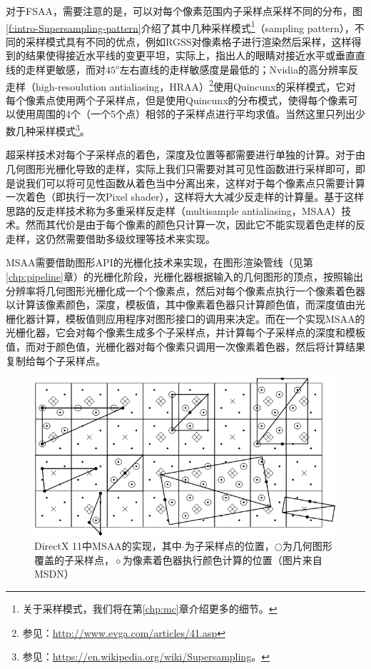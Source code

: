 对于FSAA，需要注意的是，可以对每个像素范围内子采样点采样不同的分布，图\ref{f:intro-Supersampling-pattern}介绍了其中几种采样模式\footnote{关于采样模式，我们将在第\ref{chp:mc}章介绍更多的细节。}（sampling pattern），不同的采样模式具有不同的优点，例如RGSS对像素格子进行渲染然后采样，这样得到的结果使得接近水平线的变更平坦，实际上，\cite{a:Jaggededges:whenisfilteringneeded?}指出人的眼睛对接近水平或垂直直线的走样更敏感，而对$45^{o}$左右直线的走样敏感度是最低的；Nvidia的高分辨率反走样（high-resoulution antialiasing，HRAA）\footnote{参见：\url{http://www.evga.com/articles/41.asp}}使用Quincunx的采样模式，它对每个像素点使用两个子采样点，但是使用Quincunx的分布模式，使得每个像素可以使用周围的4个（一个5个点）相邻的子采样点进行平均求值。当然这里只列出少数几种采样模式\footnote{参见：\url{https://en.wikipedia.org/wiki/Supersampling}。}。

超采样技术对每个子采样点的着色，深度及位置等都需要进行单独的计算。对于由几何图形光栅化导致的走样，实际上我们只需要对其可见性函数进行采样即可，即是说我们可以将可见性函数从着色当中分离出来，这样对于每个像素点只需要计算一次着色（即执行一次Pixel shader），这样将大大减少反走样的计算量。基于这样思路的反走样技术称为多重采样反走样（multisample antialiasing，MSAA）技术。然而其代价是由于每个像素的颜色只计算一次，因此它不能实现着色走样的反走样，这仍然需要借助多级纹理等技术来实现。

MSAA需要借助图形API的光栅化技术来实现，在图形渲染管线（见第\ref{chp:pipeline}章）的光栅化阶段，光栅化器根据输入的几何图形的顶点，按照输出分辨率将几何图形光栅化成一个个像素点，然后对每个像素点执行一个像素着色器以计算该像素颜色，深度，模板值，其中像素着色器只计算颜色值，而深度值由光栅化器计算，模板值则应用程序对图形接口的调用来决定。而在一个实现MSAA的光栅化器，它会对每个像素生成多个子采样点，并计算每个子采样点的深度和模板值，而对于颜色值，光栅化器对每个像素只调用一次像素着色器，然后将计算结果复制给每个子采样点。

\begin{figure}
	\includegraphics[width=1.\textwidth]{figures/intro/msaa}
	\caption{DirectX 11中MSAA的实现，其中$\cdot$为子采样点的位置，$\bigcirc$为几何图形覆盖的子采样点，$\diamond$为像素着色器执行颜色计算的位置（图片来自MSDN）}
	\label{f:intro-msaa}
\end{figure}

